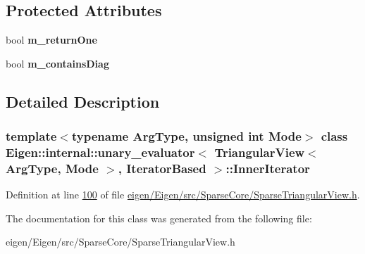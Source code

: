 \subsection*{Protected Attributes}
\begin{DoxyCompactItemize}
\item 
\mbox{\label{class_eigen_1_1internal_1_1unary__evaluator_3_01_triangular_view_3_01_arg_type_00_01_mode_01_4_0e8ca4efc3cb45e07bfa597fdc256f969_aa840daba98da9012d262e1ee1dce1f18}} 
bool {\bfseries m\+\_\+return\+One}
\item 
\mbox{\label{class_eigen_1_1internal_1_1unary__evaluator_3_01_triangular_view_3_01_arg_type_00_01_mode_01_4_0e8ca4efc3cb45e07bfa597fdc256f969_a25e4b1a15ea1a36e9118d4c586d7311c}} 
bool {\bfseries m\+\_\+contains\+Diag}
\end{DoxyCompactItemize}


\subsection{Detailed Description}
\subsubsection*{template$<$typename Arg\+Type, unsigned int Mode$>$\newline
class Eigen\+::internal\+::unary\+\_\+evaluator$<$ Triangular\+View$<$ Arg\+Type, Mode $>$, Iterator\+Based $>$\+::\+Inner\+Iterator}



Definition at line \hyperlink{eigen_2_eigen_2src_2_sparse_core_2_sparse_triangular_view_8h_source_l00100}{100} of file \hyperlink{eigen_2_eigen_2src_2_sparse_core_2_sparse_triangular_view_8h_source}{eigen/\+Eigen/src/\+Sparse\+Core/\+Sparse\+Triangular\+View.\+h}.



The documentation for this class was generated from the following file\+:\begin{DoxyCompactItemize}
\item 
eigen/\+Eigen/src/\+Sparse\+Core/\+Sparse\+Triangular\+View.\+h\end{DoxyCompactItemize}
